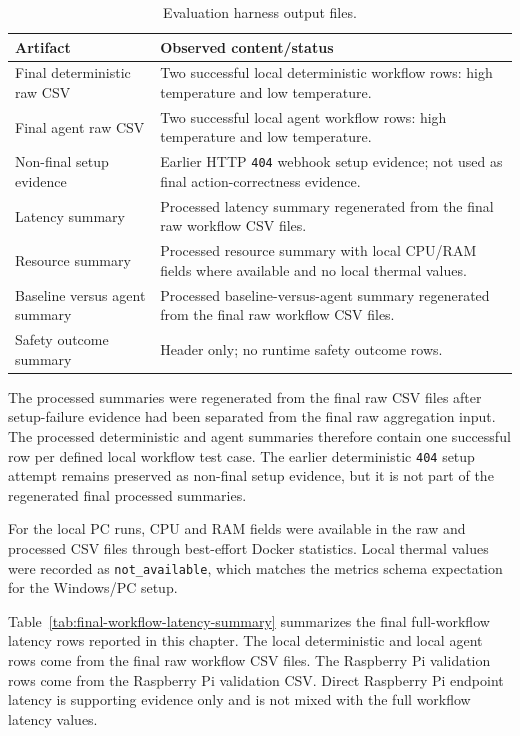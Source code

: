 \begin{table}[H]
  \centering
  \small
  \renewcommand{\arraystretch}{1.15}
  \caption{Evaluation harness output files.}
  \label{tab:evaluation-output-files}
  \begin{tabularx}{\textwidth}{@{}L{0.25\textwidth}Y@{}}
    \toprule
    Artifact & Observed content/status \\
    \midrule
    Final deterministic raw CSV & Two successful local deterministic workflow rows: high temperature and low temperature. \\
    Final agent raw CSV & Two successful local agent workflow rows: high temperature and low temperature. \\
    Non-final setup evidence & Earlier HTTP \texttt{404} webhook setup evidence; not used as final action-correctness evidence. \\
    Latency summary & Processed latency summary regenerated from the final raw workflow CSV files. \\
    Resource summary & Processed resource summary with local CPU/RAM fields where available and no local thermal values. \\
    Baseline versus agent summary & Processed baseline-versus-agent summary regenerated from the final raw workflow CSV files. \\
    Safety outcome summary & Header only; no runtime safety outcome rows. \\
    \bottomrule
  \end{tabularx}
\end{table}

The processed summaries were regenerated from the final raw CSV files after setup-failure evidence had been separated from the final raw aggregation input. The processed deterministic and agent summaries therefore contain one successful row per defined local workflow test case. The earlier deterministic \texttt{404} setup attempt remains preserved as non-final setup evidence, but it is not part of the regenerated final processed summaries.

For the local PC runs, CPU and RAM fields were available in the raw and processed CSV files through best-effort Docker statistics. Local thermal values were recorded as \texttt{not\_available}, which matches the metrics schema expectation for the Windows/PC setup.

Table~\ref{tab:final-workflow-latency-summary} summarizes the final full-workflow latency rows reported in this chapter. The local deterministic and local agent rows come from the final raw workflow CSV files. The Raspberry Pi validation rows come from the Raspberry Pi validation CSV. Direct Raspberry Pi endpoint latency is supporting evidence only and is not mixed with the full workflow latency values.


